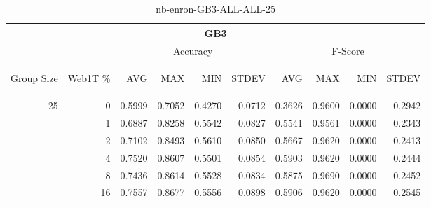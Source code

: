 \begin{center}
\begin{table}[htbp] 
 \begin{center}
\begin{tabular}{ | r | r | r | r | r | r | r | r | r | r |}
\hline
\multicolumn{10}{|c|}{GB3}\\
\hline
 & & \multicolumn{4}{|c|}{Accuracy} & \multicolumn{4}{|c|}{F-Score}\\ \cline{3-10}
\begin{sideways}Group Size\end{sideways} & \begin{sideways}Web1T \%\end{sideways} & \begin{sideways}AVG\end{sideways} & \begin{sideways}MAX\end{sideways} & \begin{sideways}MIN\end{sideways} & \begin{sideways}STDEV\end{sideways} & \begin{sideways}AVG\end{sideways} & \begin{sideways}MAX\end{sideways} & \begin{sideways}MIN\end{sideways} & \begin{sideways}STDEV\end{sideways}\\
\hline
\multirow{5}{*}{25}
 & 0 & 0.5999 & 0.7052 & 0.4270 & 0.0712 & 0.3626 & 0.9600 & 0.0000 & 0.2942\\ \cline{2-10}
 & 1 & 0.6887 & 0.8258 & 0.5542 & 0.0827 & 0.5541 & 0.9561 & 0.0000 & 0.2343\\ \cline{2-10}
 & 2 & 0.7102 & 0.8493 & 0.5610 & 0.0850 & 0.5667 & 0.9620 & 0.0000 & 0.2413\\ \cline{2-10}
 & 4 & 0.7520 & 0.8607 & 0.5501 & 0.0854 & 0.5903 & 0.9620 & 0.0000 & 0.2444\\ \cline{2-10}
 & 8 & 0.7436 & 0.8614 & 0.5528 & 0.0834 & 0.5875 & 0.9690 & 0.0000 & 0.2452\\ \cline{2-10}
 & 16 & 0.7557 & 0.8677 & 0.5556 & 0.0898 & 0.5906 & 0.9620 & 0.0000 & 0.2545\\ \cline{2-10}
\hline
\end{tabular}
\caption{nb-enron-GB3-ALL-ALL-25}
\label{table:nb-enron-GB3-ALL-ALL-25}
\end{center}
 \end{table}
\end{center}

